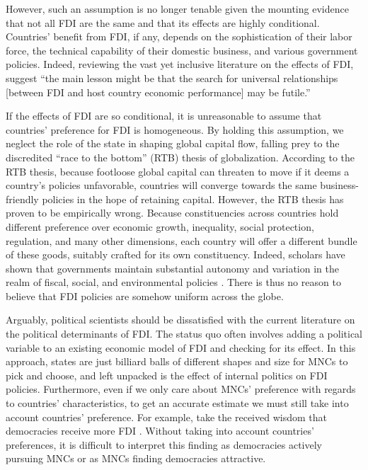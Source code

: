 However, such an assumption is no longer tenable given the mounting evidence
that not all FDI are the same and that its effects are highly conditional.
Countries' benefit from FDI, if any, depends on the sophistication of their labor
force, the technical capability of their domestic business, and various
government policies. Indeed, reviewing the vast yet inclusive literature on the
effects of FDI, \citet{Lipsey2005} suggest ``the main lesson might be that the
search for universal relationships [between FDI and host country economic
performance] may be futile.''

If the effects of FDI are so conditional, it is unreasonable to assume that
countries' preference for FDI is homogeneous. By holding this assumption, we
neglect the role of the state in shaping global capital flow, falling prey to
the discredited ``race to the bottom'' (RTB) thesis of globalization. According
to the RTB thesis, because footloose global capital can threaten to move if it
deems a country's policies unfavorable, countries will converge towards the same
business-friendly policies in the hope of retaining capital. However, the RTB
thesis has proven to be empirically wrong. Because constituencies across
countries hold different preference over economic growth, inequality, social
protection, regulation, and many other dimensions, each country will offer a
different bundle of these goods, suitably crafted for its own constituency.
Indeed, scholars have shown that governments maintain substantial autonomy and
variation in the realm of fiscal, social, and environmental policies
\citep{Mosley2005}. There is thus no reason to believe that FDI policies are
somehow uniform across the globe.

Arguably, political scientists should be dissatisfied with the current
literature on the political determinants of FDI. The status quo often involves adding a
political variable to an existing economic model of FDI and checking for its
effect. In this approach, states are just billiard balls of different shapes and
size for MNCs to pick and choose, and left unpacked is the effect of internal
politics on FDI policies. Furthermore, even if we only care about MNCs'
preference with regards to countries' characteristics, to get an accurate
estimate we must still take into account countries' preference. For example,
take the received wisdom that democracies receive more FDI \citep{Jensen2008a}.
Without taking into account countries' preferences, it is difficult to interpret
this finding as democracies actively pursuing MNCs or as MNCs finding
democracies attractive.

